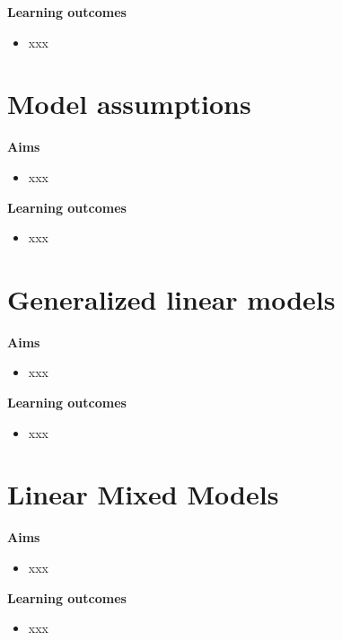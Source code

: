 \documentclass[
]{book}
\providecommand{\tightlist}{%
  \setlength{\itemsep}{0pt}\setlength{\parskip}{0pt}}
\theoremstyle{definition}
\theoremstyle{definition}
\theoremstyle{definition}
\theoremstyle{remark}
\begin{document}
\textbf{Learning outcomes}

\begin{itemize}
\tightlist
\item
  xxx
\end{itemize}

\hypertarget{model-assumptions}{%
\chapter{Model assumptions}\label{model-assumptions}}

\textbf{Aims}

\begin{itemize}
\tightlist
\item
  xxx
\end{itemize}

\textbf{Learning outcomes}

\begin{itemize}
\tightlist
\item
  xxx
\end{itemize}

\hypertarget{generalized-linear-models}{%
\chapter{Generalized linear models}\label{generalized-linear-models}}

\textbf{Aims}

\begin{itemize}
\tightlist
\item
  xxx
\end{itemize}

\textbf{Learning outcomes}

\begin{itemize}
\tightlist
\item
  xxx
\end{itemize}

\hypertarget{linear-mixed-models}{%
\chapter{Linear Mixed Models}\label{linear-mixed-models}}

\textbf{Aims}

\begin{itemize}
\tightlist
\item
  xxx
\end{itemize}

\textbf{Learning outcomes}

\begin{itemize}
\tightlist
\item
  xxx
\end{itemize}
\end{document}
